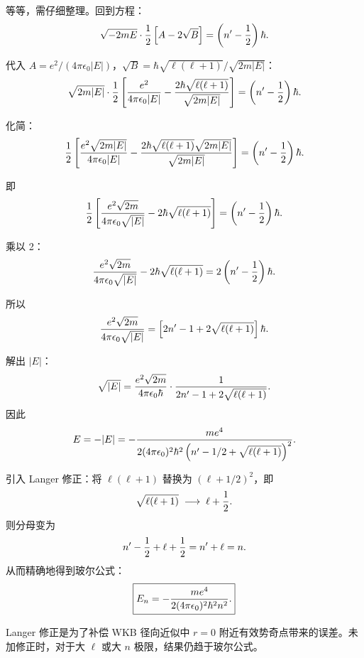 \begin{solution}
等等，需仔细整理。回到方程：
\[
\sqrt{-2mE}\cdot{1\over2}\left[A-2\sqrt{B}\right]
=\left(n'-{1\over2}\right)\hbar.
\]

代入 $A={e^2/(4\pi\epsilon_0|E|)}$，$\sqrt{B}={\hbar\sqrt{\ell(\ell+1)}/\sqrt{2m|E|}}$：
\[
\sqrt{2m|E|}\cdot{1\over2}
\left[{e^2\over4\pi\epsilon_0|E|}-{2\hbar\sqrt{\ell(\ell+1)}\over\sqrt{2m|E|}}\right]
=\left(n'-{1\over2}\right)\hbar.
\]

化简：
\[
{1\over2}\left[{e^2\sqrt{2m|E|}\over4\pi\epsilon_0|E|}
-{2\hbar\sqrt{\ell(\ell+1)}\sqrt{2m|E|}\over\sqrt{2m|E|}}\right]
=\left(n'-{1\over2}\right)\hbar.
\]

即
\[
{1\over2}\left[{e^2\sqrt{2m}\over4\pi\epsilon_0\sqrt{|E|}}
-2\hbar\sqrt{\ell(\ell+1)}\right]
=\left(n'-{1\over2}\right)\hbar.
\]

乘以 2：
\[
{e^2\sqrt{2m}\over4\pi\epsilon_0\sqrt{|E|}}
-2\hbar\sqrt{\ell(\ell+1)}
=2\left(n'-{1\over2}\right)\hbar.
\]

所以
\[
{e^2\sqrt{2m}\over4\pi\epsilon_0\sqrt{|E|}}
=\left[2n'-1+2\sqrt{\ell(\ell+1)}\right]\hbar.
\]

解出 $|E|$：
\[
\sqrt{|E|}={e^2\sqrt{2m}\over4\pi\epsilon_0\hbar}
\cdot{1\over2n'-1+2\sqrt{\ell(\ell+1)}}.
\]
因此
\[
E=-|E|=-{m e^4\over2(4\pi\epsilon_0)^2\hbar^2
\left(n'-1/2+\sqrt{\ell(\ell+1)}\right)^2}.
\]

引入 Langer 修正：将 $\ell(\ell+1)$ 替换为 $(\ell+1/2)^2$，即
\[
\sqrt{\ell(\ell+1)}\;\longrightarrow\;\ell+{1\over2}.
\]
则分母变为
\[
n'-{1\over2}+\ell+{1\over2}=n'+\ell=n.
\]
从而精确地得到玻尔公式：
\[
\boxed{E_n=-{m e^4\over2(4\pi\epsilon_0)^2\hbar^2 n^2}.}
\]

Langer 修正是为了补偿 WKB 径向近似中 $r=0$ 附近有效势奇点带来的误差。未加修正时，对于大 $\ell$ 或大 $n$ 极限，结果仍趋于玻尔公式。
\end{solution}

